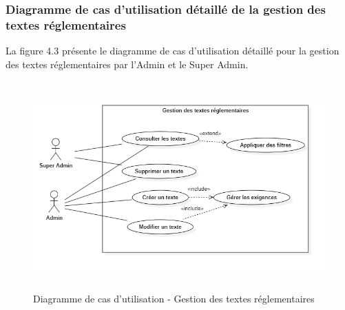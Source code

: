 \subsubsection{Diagramme de cas d'utilisation détaillé de la gestion des textes réglementaires}
\noindent La figure 4.3 présente le diagramme de cas d'utilisation détaillé pour la gestion des textes réglementaires par l'Admin et le Super Admin.

\begin{figure}[H]
    \centering
    \includegraphics[width=12cm,height=8cm]{images/textsuc.png}
    \caption{Diagramme de cas d'utilisation - Gestion des textes réglementaires}
\end{figure}

